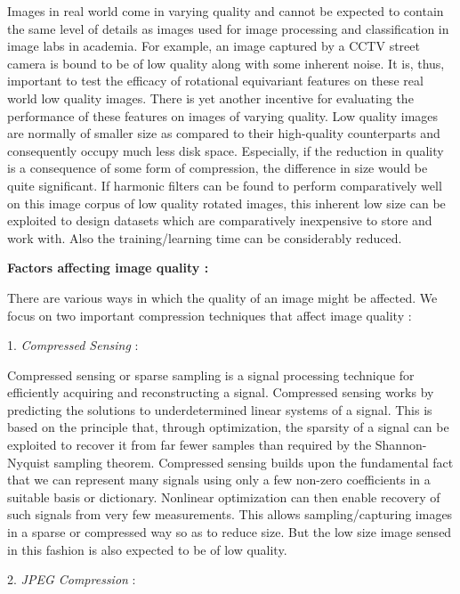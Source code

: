 \documentclass{article}
\begin{document}
Images in real world come in varying quality and cannot be expected to contain the same level of details as images used for image processing and classification in image labs in academia. For example, an image captured by a CCTV street camera is bound to be of low quality along with some inherent noise. It is, thus, important to test the efficacy of rotational equivariant features on these real world low quality images. There is yet another incentive for evaluating the performance of these features on images of varying quality. Low quality images are normally of smaller size as compared to their high-quality counterparts and consequently occupy much less disk space. Especially, if the reduction in quality is a consequence of some form of compression, the difference in size would be quite significant. If harmonic filters can be found to perform comparatively well on this image corpus of low quality rotated images, this inherent low size can be exploited to design datasets which are comparatively inexpensive to store and work with. Also the training/learning time can be considerably reduced.

\textbf{Factors affecting image quality :}

There are various ways in which the quality of an image might be affected. We focus on two important compression techniques that affect image quality :

1.	\emph{Compressed Sensing} : 

Compressed sensing or sparse sampling is a signal processing technique for efficiently acquiring and reconstructing a signal. Compressed sensing works by predicting the solutions to underdetermined linear systems of a signal. This is based on the principle that, through optimization, the sparsity of a signal can be exploited to recover it from far fewer samples than required by the Shannon-Nyquist sampling theorem. Compressed sensing builds upon the fundamental fact that we can represent many signals using only a few non-zero coefficients in a suitable basis or dictionary. Nonlinear optimization can then enable recovery of such signals from very few measurements. This allows sampling/capturing images in a sparse or compressed way so as to reduce size. But the low size image sensed in this fashion is also expected to be of low quality.

2.	\emph{ JPEG Compression }:
\end{document}

